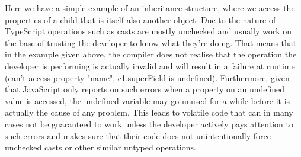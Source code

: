 Here we have a simple example of an inheritance structure, where we access the properties of a child that is itself also another object. Due to the nature of TypeScript operations such as casts are mostly unchecked and usually work on the base of trusting the developer to know what they're doing. That means that in the example given above, the compiler does not realise that the operation the developer is performing is actually invalid and will result in a failure at runtime (can't access property "name", c1.superField is undefined). Furthermore, given that JavaScript only reports on such errors when a property on an undefined value is accessed, the undefined variable may go unused for a while before it is actually the cause of any problem. This leads to volatile code that can in many cases not be guaranteed to work unless the developer actively pays attention to such errors and makes sure that their code does not unintentionally force unchecked casts or other similar untyped operations.
